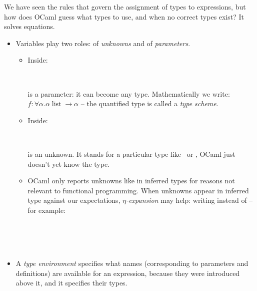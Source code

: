 \documentclass{beamer}
\newcommand{\tmem}[1]{{\em #1\/}}
\newcommand{\tmop}[1]{\ensuremath{\operatorname{#1}}}
\newcommand{\tmverbatim}[1]{\text{{\ttfamily{#1}}}}
\begin{document}
We have seen the rules that govern the assignment of types to expressions, but
how does OCaml guess what types to use, and when no correct types exist? It
solves equations.
\begin{itemize}
  \item Variables play two roles: of {\tmem{unknowns}} and of
  {\tmem{parameters}}.
  \begin{itemize}
    \item Inside:
    
    {\hlstd{\# }}{}{}{\hlopt{=
    }}{}{}{}{\hlopt{;;}}{\hlendline{}}\\
    {}{}{\hlopt{: }}{}{\hlopt{->
    }}{}
    
    \tmverbatim{'a} is a parameter: it can become any type. Mathematically we
    write: $f : \forall \alpha . \alpha \tmop{list} \rightarrow \alpha$ -- the
    quantified type is called a {\tmem{type scheme}}.
    
    \item Inside:
    
    {\hlstd{\# }}{}{}{\hlopt{= }}{}{\hlopt{[];;}}{\hlendline{}}\\
    {}{}{\hlopt{: }}{}{}
    
    \tmverbatim{'\_a} is an unknown. It stands for a particular type like
    {} \ or {\hlopt{(}}{}{\hlopt{->
    }}{}{\hlopt{)}}, OCaml just doesn't yet know the type.
    
    \item OCaml only reports unknowns like \tmverbatim{'\_a} in inferred types
    for reasons not relevant to functional programming. When unknowns appear
    in inferred type against our expectations, {\tmem{$\eta$-expansion}} may
    help: writing {}{}{\hlopt{= }}{}
    instead of {}{}{\hlopt{= }}{} -- for
    example:
    
    {\hlstd{\# }}{}{}{\hlopt{=
    }}{}{}{}{\hlopt{[];;}}{\hlendline{}}\\
    {}{}{\hlopt{: }}{}{\hlopt{-> }}{}{\hlopt{=
    <}}{}{\hlopt{>}}{\hlendline{}}\\
    {\hlstd{\# }}{}{}{\hlopt{=
    }}{}{}{}{\hlopt{[]
    }}{}{\hlopt{;;}}{\hlendline{}}\\
    {}{}{\hlopt{: }}{}{\hlopt{->
    }}{}{\hlopt{= <}}{}{\hlopt{>}}
  \end{itemize}
  \item A {\tmem{type environment}} specifies what names (corresponding to
  parameters and definitions) are available for an expression, because they
  were introduced above it, and it specifies their types.
  

\end{itemize}
\end{document}
